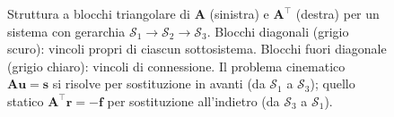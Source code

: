 \begin{figure}[ht]
		\caption{Struttura a blocchi triangolare di $\bm{A}$
			(sinistra) e $\bm{A}^{\top}$ (destra) per un
			sistema con gerarchia
			$\mathcal{S}_1 \to \mathcal{S}_2 \to \mathcal{S}_3$.
			Blocchi diagonali (grigio scuro): vincoli propri
			di ciascun sottosistema. Blocchi fuori diagonale
			(grigio chiaro): vincoli di connessione.
			Il problema cinematico $\bm{A}\bm{u}=\bm{s}$ si
			risolve per sostituzione in avanti (da
			$\mathcal{S}_1$ a $\mathcal{S}_3$); quello statico
			$\bm{A}^{\top}\bm{r}=-\bm{f}$ per sostituzione
			all'indietro (da $\mathcal{S}_3$ a $\mathcal{S}_1$).}
		\label{fig:blocchi_triangolari}
	\end{figure}
